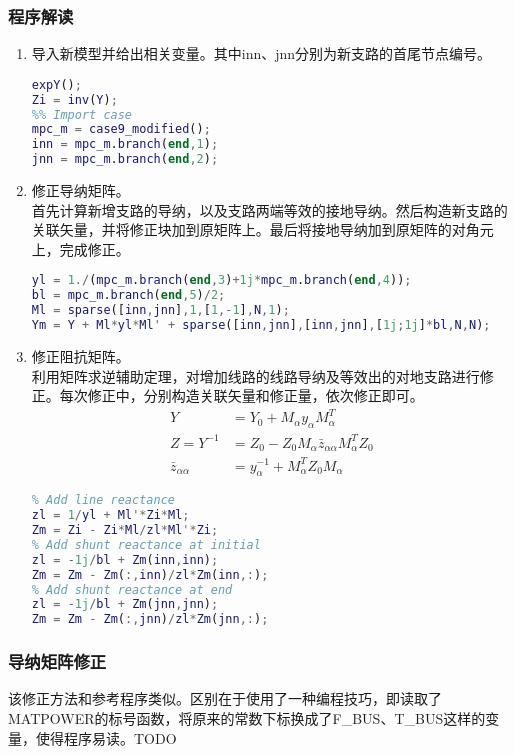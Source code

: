 \documentclass[a4paper,12pt]{article}
\begin{document}
    \subsubsection{程序解读}
    \begin{enumerate}
      \item 导入新模型并给出相关变量。其中inn、jnn分别为新支路的首尾节点编号。
      \begin{lstlisting}[language=matlab]
%% previous
expY();
Zi = inv(Y);
%% Import case
mpc_m = case9_modified();
inn = mpc_m.branch(end,1);
jnn = mpc_m.branch(end,2);
      \end{lstlisting}
      \item 修正导纳矩阵。\\
      首先计算新增支路的导纳，以及支路两端等效的接地导纳。然后构造新支路的关联矢量，并将修正块加到原矩阵上。最后将接地导纳加到原矩阵的对角元上，完成修正。
      \begin{lstlisting}[language=matlab]
%% Modify Y
yl = 1./(mpc_m.branch(end,3)+1j*mpc_m.branch(end,4));
bl = mpc_m.branch(end,5)/2;
Ml = sparse([inn,jnn],1,[1,-1],N,1);
Ym = Y + Ml*yl*Ml' + sparse([inn,jnn],[inn,jnn],[1j;1j]*bl,N,N);
      \end{lstlisting}
      \item 修正阻抗矩阵。\\
      利用矩阵求逆辅助定理，对增加线路的线路导纳及等效出的对地支路进行修正。每次修正中，分别构造关联矢量和修正量，依次修正即可。
      \begin{equation}
        \begin{aligned}
          Y &= Y_0+M_\alpha y_\alpha M_\alpha^T\\
          Z=Y^{-1}&= Z_0 -Z_0 M_\alpha \bar z_{\alpha\alpha} M_\alpha^T Z_0\\
          \bar z_{\alpha\alpha}&=y_\alpha^{-1}+M_\alpha^T Z_0 M_\alpha
        \end{aligned}
      \end{equation}
      \begin{lstlisting}[language=matlab]
%% Modify Z
% Add line reactance
zl = 1/yl + Ml'*Zi*Ml;
Zm = Zi - Zi*Ml/zl*Ml'*Zi;
% Add shunt reactance at initial
zl = -1j/bl + Zm(inn,inn);
Zm = Zm - Zm(:,inn)/zl*Zm(inn,:);
% Add shunt reactance at end
zl = -1j/bl + Zm(jnn,jnn);
Zm = Zm - Zm(:,jnn)/zl*Zm(jnn,:);
      \end{lstlisting}
    \end{enumerate}
    \subsubsection{导纳矩阵修正}
    该修正方法和参考程序类似。区别在于使用了一种编程技巧，即读取了MATPOWER的标号函数，将原来的常数下标换成了F\_BUS、T\_BUS这样的变量，使得程序易读。TODO
    \begin{lstlisting}[language=matlab,label=lst:q2q1p1,caption={导纳矩阵修正程序}]
    \end{lstlisting}
\end{document}
